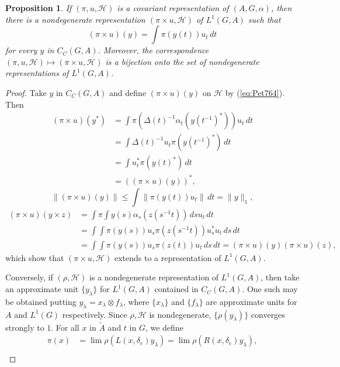 \documentclass{book}
\newtheorem{proposition}[definition]{Proposition}
\begin{document}
\begin{proposition}\label{Petersen:764}
  If \((\pi,u,\mathcal{H})\) is a covariant representation of \((A,G,\alpha)\), then there is a nondegenerate representation \((\pi\times u,\mathcal{H})\) of \(L^1(G,A)\) such that
  \begin{equation}\label{eq:Pet764}
    (\pi\times u)(y)=\int\pi(y(t))u_t\,dt
  \end{equation}
  for every \(y\) in \(C_C(G,A)\). Moreover, the correspondence \((\pi,u,\mathcal{H})\mapsto (\pi\times u,\mathcal{H})\)
  is a bijection onto the set of nondegenerate representations of \(L^1(G,A)\).
\end{proposition}
\begin{proof}
  Take \(y\) in \(C_C(G,A)\) and define \((\pi\times u)(y)\) on \(\mathcal{H}\) by (\ref{eq:Pet764}). Then
  \begin{align*}
    (\pi\times u)(y^*)&=\int\pi({\Delta(t)}^{-1}\alpha_t({y(t^{-1})}^*))u_t\,dt\\
    &=\int{\Delta(t)}^{-1}u_t\pi({y(t^{-1})}^{*})\,dt\\
    &=\int u_t^*\pi({y(t)}^{*})\,dt\\
    &={((\pi\times u)(y))}^*,
  \end{align*}
  \[
    \|(\pi\times u)(y)\|\leq\int\|\pi(y(t))u_t\|\,dt=\|y\|_1,
  \]
  \begin{align*} 
    (\pi\times u)(y\times z)&=\int\pi\int y(s)\alpha_s(z(s^{-1}t))\,ds u_t\,dt\\
    &=\int\int\pi(y(s))u_s \pi(z(s^{-1}t))u_s^* u_t\,ds\,dt\\
    &=\int\int\pi(y(s))u_s\pi(z(t))u_t\,ds\,dt=(\pi\times u)(y)(\pi\times u)(z),
  \end{align*}
  which show that \((\pi\times u,\mathcal{H})\) extends to a representation of \(L^1(G,A)\).\par
  Conversely, if \((\rho,\mathcal{H})\) is a nondegenerate representation of \(L^1(G,A)\), then take
  an approximate unit \(\{y_\lambda\}\) for \(L^1(G,A)\) contained in \(C_C(G,A)\).
  One such may be obtained putting \(y_\lambda=x_\lambda\otimes f_\lambda\), where \(\{x_\lambda\}\) and \(\{f_\lambda\}\)
  are approximate units for \(A\) and \(L^1(G)\) respectively. Since \(\rho,\mathcal{H}\) is nondegenerate,
  \(\{\rho(y_\lambda)\}\) converges strongly to \(1\). For all \(x\) in \(\tilde{A}\) and \(t\) in \(G\), we define
  \begin{align*}
    \pi(x)&=\lim\rho(L(x,\delta_e)y_\lambda)=\lim\rho(R(x,\delta_e)y_\lambda),\\

\end{align*}
\end{proof}
\end{document}
